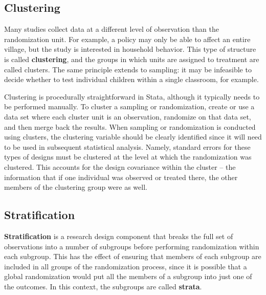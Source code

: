 \subsection{Clustering}

Many studies collect data at a different level of observation than the randomization unit.
For example, a policy may only be able to affect an entire village,
but the study is interested in household behavior.
This type of structure is called \textbf{clustering},
and the groups in which units are assigned to treatment are called clusters.
The same principle extends to sampling:
it may be infeasible to decide whether to test individual children
within a single classroom, for example.

Clustering is procedurally straightforward in Stata,
although it typically needs to be performed manually.
To cluster a sampling or randomization,
create or use a data set where each cluster unit is an observation,
randomize on that data set, and then merge back the results.
When sampling or randomization is conducted using clusters,
the clustering variable should be clearly identified
since it will need to be used in subsequent statistical analysis.
Namely, standard errors for these types of designs must be clustered
at the level at which the randomization was clustered.
This accounts for the design covariance within the cluster --
the information that if one individual was observed or treated there,
the other members of the clustering group were as well.

\subsection{Stratification}

\textbf{Stratification} is a research design component
that breaks the full set of observations into a number of subgroups
before performing randomization within each subgroup.
This has the effect of ensuring that members of each subgroup
are included in all groups of the randomization process,
since it is possible that a global randomization
would put all the members of a subgroup into just one of the outcomes.
In this context, the subgroups are called \textbf{strata}.

